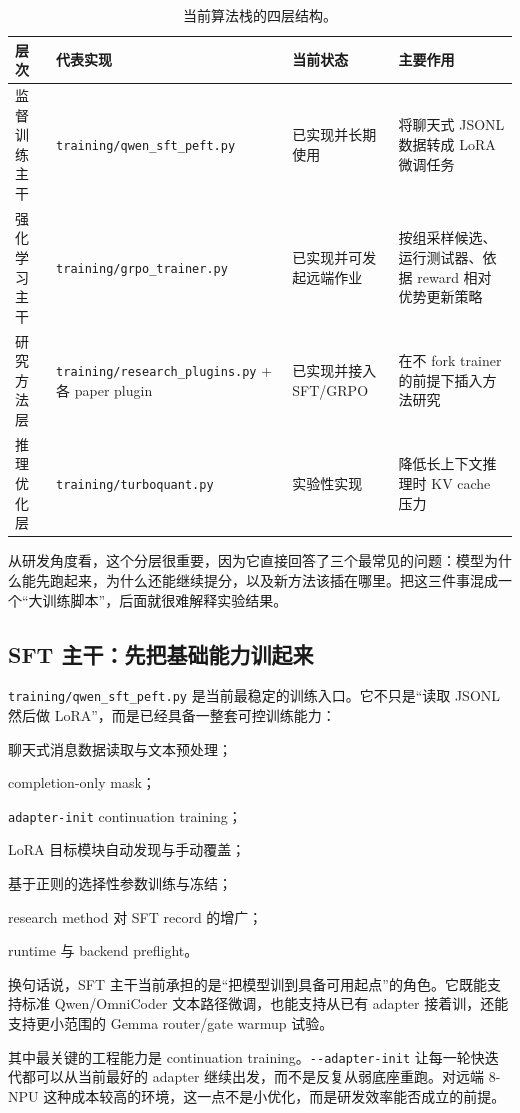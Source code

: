 \documentclass[11pt,a4paper]{article}
\newcommand{\code}[1]{\begingroup\ttfamily\footnotesize\nolinkurl{#1}\endgroup}
\begin{document}
\begin{table}[htbp]
\centering
\small
\begin{tabularx}{\textwidth}{p{2.3cm} p{3.2cm} p{2.6cm} Y}
\toprule
层次 & 代表实现 & 当前状态 & 主要作用 \\
\midrule
监督训练主干 & \code{training/qwen_sft_peft.py} & 已实现并长期使用 & 将聊天式 JSONL 数据转成 LoRA 微调任务 \\
强化学习主干 & \code{training/grpo_trainer.py} & 已实现并可发起远端作业 & 按组采样候选、运行测试器、依据 reward 相对优势更新策略 \\
研究方法层 & \code{training/research_plugins.py} + 各 paper plugin & 已实现并接入 SFT/GRPO & 在不 fork trainer 的前提下插入方法研究 \\
推理优化层 & \code{training/turboquant.py} & 实验性实现 & 降低长上下文推理时 KV cache 压力 \\
\bottomrule
\end{tabularx}
\caption{当前算法栈的四层结构。}
\label{tab:algo-stack}
\end{table}

从研发角度看，这个分层很重要，因为它直接回答了三个最常见的问题：模型为什么能先跑起来，为什么还能继续提分，以及新方法该插在哪里。把这三件事混成一个“大训练脚本”，后面就很难解释实验结果。

\subsection{SFT 主干：先把基础能力训起来}

\code{training/qwen_sft_peft.py} 是当前最稳定的训练入口。它不只是“读取 JSONL 然后做 LoRA”，而是已经具备一整套可控训练能力：

  \par 聊天式消息数据读取与文本预处理；
  \par completion-only mask；
  \par \code{adapter-init} continuation training；
  \par LoRA 目标模块自动发现与手动覆盖；
  \par 基于正则的选择性参数训练与冻结；
  \par research method 对 SFT record 的增广；
  \par runtime 与 backend preflight。

换句话说，SFT 主干当前承担的是“把模型训到具备可用起点”的角色。它既能支持标准 Qwen/OmniCoder 文本路径微调，也能支持从已有 adapter 接着训，还能支持更小范围的 Gemma router/gate warmup 试验。

其中最关键的工程能力是 continuation training。\code{--adapter-init} 让每一轮快迭代都可以从当前最好的 adapter 继续出发，而不是反复从弱底座重跑。对远端 8-NPU 这种成本较高的环境，这一点不是小优化，而是研发效率能否成立的前提。
\end{document}
